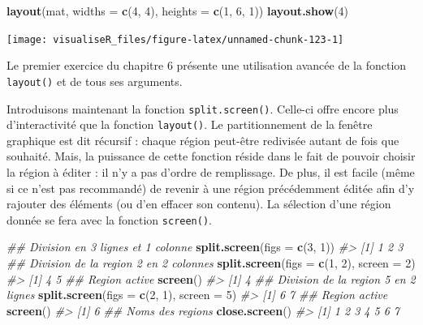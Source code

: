 \documentclass[]{article}
\newenvironment{Shaded}{\begin{snugshade}}{\end{snugshade}}
\newcommand{\CommentTok}[1]{\textcolor[rgb]{0.56,0.35,0.01}{\textit{#1}}}
\newcommand{\DataTypeTok}[1]{\textcolor[rgb]{0.13,0.29,0.53}{#1}}
\newcommand{\DecValTok}[1]{\textcolor[rgb]{0.00,0.00,0.81}{#1}}
\newcommand{\KeywordTok}[1]{\textcolor[rgb]{0.13,0.29,0.53}{\textbf{#1}}}
\newcommand{\NormalTok}[1]{#1}
\begin{document}
\begin{Shaded}
\begin{Highlighting}[]
\KeywordTok{layout}\NormalTok{(mat, }\DataTypeTok{widths =} \KeywordTok{c}\NormalTok{(}\DecValTok{4}\NormalTok{, }\DecValTok{4}\NormalTok{), }\DataTypeTok{heights =} \KeywordTok{c}\NormalTok{(}\DecValTok{1}\NormalTok{, }\DecValTok{6}\NormalTok{, }\DecValTok{1}\NormalTok{))}
\KeywordTok{layout.show}\NormalTok{(}\DecValTok{4}\NormalTok{)}
\end{Highlighting}
\end{Shaded}

\begin{center}\texttt{[image: visualiseR\_files/figure-latex/unnamed-chunk-123-1]} \end{center}

Le premier exercice du chapitre 6 présente une utilisation avancée de la fonction \texttt{layout()} et de tous ses arguments.

Introduisons maintenant la fonction \texttt{split.screen()}. Celle-ci offre encore plus
d'interactivité que la fonction \texttt{layout()}. Le partitionnement de la fenêtre
graphique est dit récursif : chaque région peut-être redivisée autant de fois
que souhaité. Mais, la puissance de cette fonction réside dans le fait de
pouvoir choisir la région à éditer : il n'y a pas d'ordre de remplissage. De
plus, il est facile (même si ce n'est pas recommandé) de revenir à une région
précédemment éditée afin d'y rajouter des éléments (ou d'en effacer son
contenu). La sélection d'une région donnée se fera avec la fonction \texttt{screen()}.

\begin{Shaded}
\begin{Highlighting}[]
\CommentTok{## Division en 3 lignes et 1 colonne}
\KeywordTok{split.screen}\NormalTok{(}\DataTypeTok{figs =} \KeywordTok{c}\NormalTok{(}\DecValTok{3}\NormalTok{, }\DecValTok{1}\NormalTok{))}
\CommentTok{#> [1] 1 2 3}
\CommentTok{## Division de la region 2 en 2 colonnes}
\KeywordTok{split.screen}\NormalTok{(}\DataTypeTok{figs =} \KeywordTok{c}\NormalTok{(}\DecValTok{1}\NormalTok{, }\DecValTok{2}\NormalTok{), }\DataTypeTok{screen =} \DecValTok{2}\NormalTok{)}
\CommentTok{#> [1] 4 5}
\CommentTok{## Region active}
\KeywordTok{screen}\NormalTok{()}
\CommentTok{#> [1] 4}
\CommentTok{## Division de la region 5 en 2 lignes}
\KeywordTok{split.screen}\NormalTok{(}\DataTypeTok{figs =} \KeywordTok{c}\NormalTok{(}\DecValTok{2}\NormalTok{, }\DecValTok{1}\NormalTok{), }\DataTypeTok{screen =} \DecValTok{5}\NormalTok{)}
\CommentTok{#> [1] 6 7}
\CommentTok{## Region active}
\KeywordTok{screen}\NormalTok{()}
\CommentTok{#> [1] 6}
\CommentTok{## Noms des regions}
\KeywordTok{close.screen}\NormalTok{()}
\CommentTok{#> [1] 1 2 3 4 5 6 7}
\end{Highlighting}
\end{Shaded}
\end{document}
